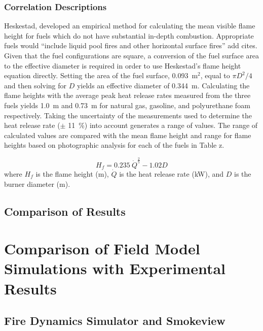 \documentclass[twoside]{uocthesis}
\begin{document}
\subsection{Correlation Descriptions}
Heskestad, developed an empirical method for calculating the mean visible flame height for fuels which do not have substantial in-depth combustion.  Appropriate fuels would ``include liquid pool fires and other horizontal surface fires'' add cites.  Given that the fuel configurations are square, a conversion of the fuel surface area to the effective diameter is required in order to use Heskestad's flame height equation directly.  Setting the area of the fuel surface, 0.093~m$^2$, equal to $\pi D^2/4$ and then solving for $D$ yields an effective diameter of 0.344~m.
Calculating the flame heights with the average peak heat release rates measured from the three fuels yields 1.0~m and 0.73~m for natural gas, gasoline, and polyurethane foam respectively. Taking the uncertainty of the measurements used to determine the heat release rate ($\pm$ 11~\%) into account generates a range of values.   The range of calculated values are compared with the mean flame height and range for flame heights  based on photographic analysis for each of the fuels in Table z.

\begin{equation}\label{eq:flame_height}
H_f = 0.235\: \dot{Q}^{\frac{2}{5}} - 1.02 D
\end{equation}
where $H_{f}$ is the flame height (m), $\dot{Q}$ is the heat release rate (kW), and $D$ is the burner diameter (m).


\section{Comparison of Results}

\chapter{Comparison of Field Model Simulations with Experimental Results}

\section{Fire Dynamics Simulator and Smokeview}
\end{document}
